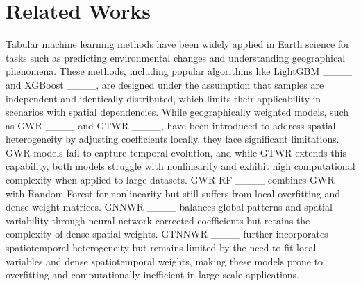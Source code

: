 \section{Related Works}
Tabular machine learning methods have been widely applied in Earth science for tasks such as predicting environmental changes and understanding geographical phenomena. These methods, including popular algorithms like LightGBM ____ and XGBoost ____, are designed under the assumption that samples are independent and identically distributed, which limits their applicability in scenarios with spatial dependencies. While geographically weighted models, such as GWR ____ and GTWR ____, have been introduced to address spatial heterogeneity by adjusting coefficients locally, they face significant limitations. GWR models fail to capture temporal evolution, and while GTWR extends this capability, both models struggle with nonlinearity and exhibit high computational complexity when applied to large datasets. GWR-RF ____ combines GWR with Random Forest for nonlinearity but still suffers from local overfitting and dense weight matrices. GNNWR ____ balances global patterns and spatial variability through neural network-corrected coefficients but retains the complexity of dense spatial weights. GTNNWR ____ further incorporates spatiotemporal heterogeneity but remains limited by the need to fit local variables and dense spatiotemporal weights, making these models prone to overfitting and computationally inefficient in large-scale applications.